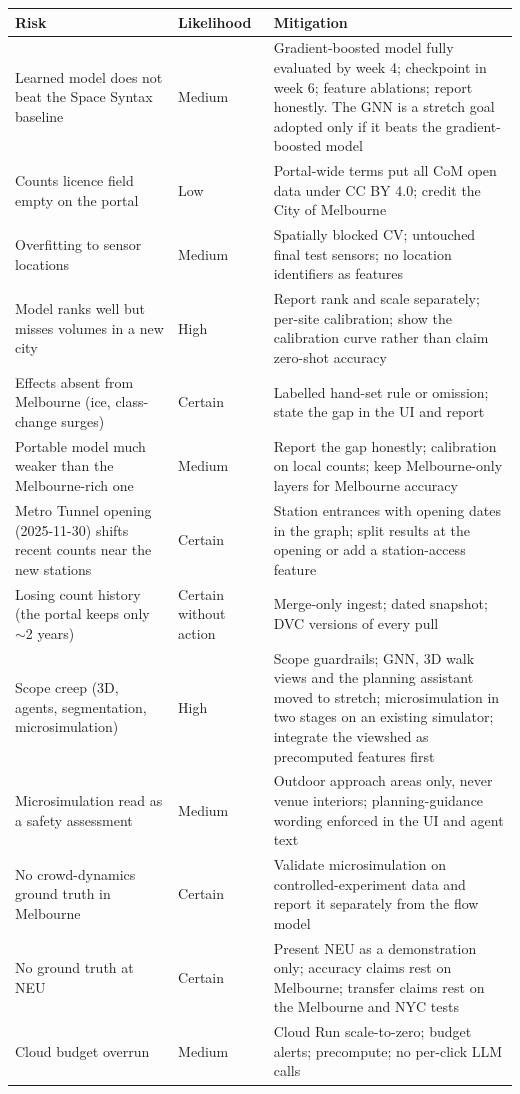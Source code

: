 \documentclass[11pt]{article}
\newcommand{\hrow}{\rowcolor{headgray}}
\begin{document}
\begin{xltabular}{\linewidth}{|L{4.4cm}|L{2.0cm}|Y|}
\hline\hrow
\textbf{Risk} & \textbf{Likelihood} & \textbf{Mitigation} \\\hline
\endhead
Learned model does not beat the Space Syntax baseline & Medium & Gradient-boosted model fully evaluated by week 4; checkpoint in week 6; feature ablations; report honestly. The GNN is a stretch goal adopted only if it beats the gradient-boosted model \\\hline
Counts licence field empty on the portal & Low & Portal-wide terms put all CoM open data under CC BY 4.0; credit the City of Melbourne \\\hline
Overfitting to sensor locations & Medium & Spatially blocked CV; untouched final test sensors; no location identifiers as features \\\hline
Model ranks well but misses volumes in a new city & High & Report rank and scale separately; per-site calibration; show the calibration curve rather than claim zero-shot accuracy \\\hline
Effects absent from Melbourne (ice, class-change surges) & Certain & Labelled hand-set rule or omission; state the gap in the UI and report \\\hline
Portable model much weaker than the Melbourne-rich one & Medium & Report the gap honestly; calibration on local counts; keep Melbourne-only layers for Melbourne accuracy \\\hline
Metro Tunnel opening (2025-11-30) shifts recent counts near the new stations & Certain & Station entrances with opening dates in the graph; split results at the opening or add a station-access feature \\\hline
Losing count history (the portal keeps only $\sim$2 years) & Certain without action & Merge-only ingest; dated snapshot; DVC versions of every pull \\\hline
Scope creep (3D, agents, segmentation, microsimulation) & High & Scope guardrails; GNN, 3D walk views and the planning assistant moved to stretch; microsimulation in two stages on an existing simulator; integrate the viewshed as precomputed features first \\\hline
Microsimulation read as a safety assessment & Medium & Outdoor approach areas only, never venue interiors; planning-guidance wording enforced in the UI and agent text \\\hline
No crowd-dynamics ground truth in Melbourne & Certain & Validate microsimulation on controlled-experiment data and report it separately from the flow model \\\hline
No ground truth at NEU & Certain & Present NEU as a demonstration only; accuracy claims rest on Melbourne; transfer claims rest on the Melbourne and NYC tests \\\hline
Cloud budget overrun & Medium & Cloud Run scale-to-zero; budget alerts; precompute; no per-click LLM calls \\\hline
\end{xltabular}
\end{document}
